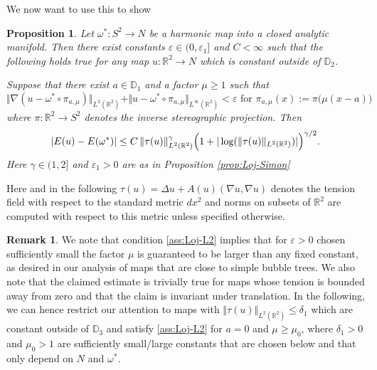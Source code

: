 \documentclass[10pt,reqno]{amsart}
\theoremstyle{plain}
\newtheorem{prop}[lemma]{Proposition}
\theoremstyle{definition}
\newtheorem{rmk}[lemma]{Remark}
\numberwithin{equation}{section}
\newcommand{\ga}{\gamma}
\newcommand{\de}{\delta}
\newcommand{\om}{\omega}
\newcommand{\D}{\mathbb{D}}
\newcommand{\R}{\ensuremath{{\mathbb R}}}
\newcommand{\norm}[1]{\Vert#1\Vert}
\newcommand{\beq}{\begin{equation}}
\newcommand{\eeq}{\end{equation}}
\newcommand{\abs}[1]{\vert#1\vert}
\newcommand{\eps}{\varepsilon}
\newcommand{\na}{\nabla}
\begin{document}
We now want to use this to show


\begin{prop}\label{prop:Loj-L^2}
Let $\om^* : S^2 \to N$ be a harmonic map into a closed analytic manifold.
Then there exist constants $\eps\in(0,\eps_1]$ and $C<\infty$ 
such that the following holds true for any map 
$u:\R^2\to N$ which
is constant outside of $\D_2$.

Suppose that 
there exist $a\in\D_1$ and a factor $\mu\geq 1$ such that
\beq
\label{ass:Loj-L2}
\norm{\na(u-\om^*\circ \pi_{a,\mu})}_{L^2(\R^2)} + \norm{u-\om^*\circ \pi_{a,\mu}}_{L^\infty(\R^2)}
<\eps \text{ for } \pi_{a,\mu}(x):=\pi\bigl(\mu(x-a)\bigr)
\eeq
where $\pi:\R^2\to S^2$ denotes the inverse stereographic projection. Then
\beq \label{claim:Loj-L2}
\abs{E(u)-E(\om^*)}
\leq
C\,\norm{\tau(u)}_{L^2(\R^2)}^{\ga}
\Bigl(1+\abs{\log(\norm{\tau(u)}_{L^2(\R^2)})}\Bigr)^{\ga/2}.
\eeq
Here $\gamma\in (1,2]$ and $\eps_1>0$ are as in Proposition \ref{prop:Loj-Simon}
\end{prop}


Here and in the following $\tau(u)=\Delta u+A(u)(\na u,\na u)$ denotes the tension field with respect to the standard
metric $dx^2$ and norms on subsets of $\R^2$ are computed with respect to this
metric unless specified otherwise. 


\begin{rmk} \label{rmk:mu-large}
We note that condition \eqref{ass:Loj-L2} implies that  for $\eps>0$ chosen sufficiently small the factor $\mu$ is guaranteed to be larger than any fixed constant, as desired in our analysis of maps that are close to simple bubble trees. We also note that the claimed estimate is trivially true for maps whose tension is bounded away from zero and that the claim is invariant under translation. In the following, we can hence restrict our attention to maps with
$\norm{\tau(u)}_{L^2(\R^2)}\leq \de_1$
which are constant outside of $\D_3$ and satisfy \eqref{ass:Loj-L2} for $a=0$ and $\mu\geq \mu_0$, where $\de_1>0$ and $\mu_0 >1$ are sufficiently small/large constants that are chosen below and that only depend on $N$ and $\om^*$. 
\end{rmk}
\end{document}
